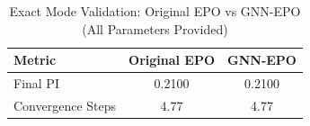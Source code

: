
\begin{table}[H]
\centering
\caption{Exact Mode Validation: Original EPO vs GNN-EPO (All Parameters Provided)}
\label{tab:exact_validation}
\begin{tabular}{lcc}
\hline
\textbf{Metric} & \textbf{Original EPO} & \textbf{GNN-EPO} \\
\hline
Final PI & 0.2100 & 0.2100 \\
Convergence Steps & 4.77 & 4.77 \\
\hline
\end{tabular}
\end{table}

